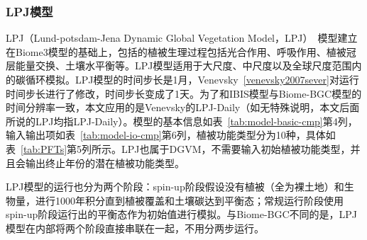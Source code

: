 \subsubsection{LPJ模型}
LPJ（Lund-potsdam-Jena Dynamic Global Vegetation Model，LPJ）~\cite{sitch2003evaluation}模型建立在Biome3模型的基础上，包括的植被生理过程包括光合作用、呼吸作用、植被冠层能量交换、土壤水平衡等。LPJ模型适用于大尺度、中尺度以及全球尺度范围内的碳循环模拟。LPJ模型的时间步长是1月，Venevsky~\ref{venevsky2007sever}对运行时间步长进行了修改，时间步长变成了1天。为了和IBIS模型与Biome-BGC模型的时间分辨率一致，本文应用的是Venevsky的LPJ-Daily（如无特殊说明，本文后面所说的LPJ均指LPJ-Daily）。模型的基本信息如表~\ref{tab:model-basic-cmp}第4列，输入输出项如表~\ref{tab:model-io-cmp}第6列，植被功能类型分为10种，具体如表~\ref{tab:PFTs}第5列所示。LPJ也属于DGVM，不需要输入初始植被功能类型，并且会输出终止年份的潜在植被功能类型。

LPJ模型的运行也分为两个阶段：spin-up阶段假设没有植被（全为裸土地）和生物量，进行1000年积分直到植被覆盖和土壤碳达到平衡态；常规运行阶段使用spin-up阶段运行出的平衡态作为初始值进行模拟。与Biome-BGC不同的是，LPJ模型在内部将两个阶段直接串联在一起，不用分两步运行。

